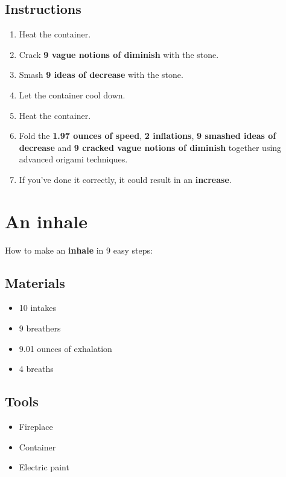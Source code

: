 \documentclass{article}
\begin{document}
\subsection{Instructions}\begin{enumerate}
\item 
Heat the container.
\item 
Crack \textbf{9 vague notions of diminish} with the stone.
\item 
Smash \textbf{9 ideas of decrease} with the stone.
\item 
Let the container cool down.
\item 
Heat the container.
\item 
Fold the \textbf{1.97 ounces of speed}, \textbf{2 inflations}, \textbf{9 smashed ideas of decrease} and \textbf{9 cracked vague notions of diminish} together using advanced origami techniques.
\item 
If you've done it correctly, it could result in an \textbf{increase}.
\end{enumerate}
\newpage
\section{An inhale}How to make an \textbf{inhale} in 9 easy steps:

\subsection{Materials}\begin{itemize}
\item 
10 intakes
\item 
9 breathers
\item 
9.01 ounces of exhalation
\item 
4 breaths
\end{itemize}
\subsection{Tools}\begin{itemize}
\item 
Fireplace
\item 
Container
\item 
Electric paint
\end{itemize}
\end{document}
